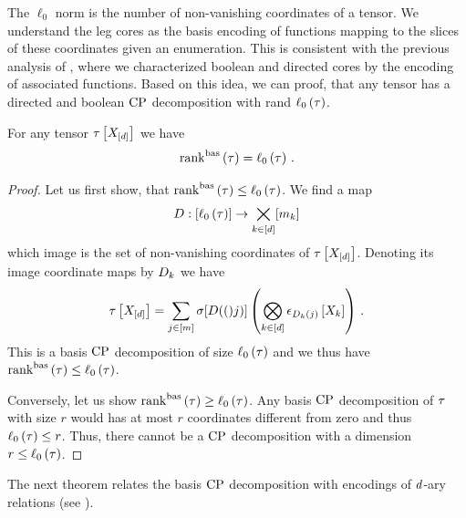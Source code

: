 
The $\ell_0$ norm is the number of non-vanishing coordinates of a tensor.
We understand the leg cores as the basis encoding of functions mapping to the slices of these coordinates given an enumeration.
This is consistent with the previous analysis of , where we characterized boolean and directed cores by the encoding of associated functions.
Based on this idea, we can proof, that any tensor has a directed and boolean $\mathrm{CP}$ decomposition with rand $\ell_0\left(\tau\right)$.


\begin{theorem}
    \label{the:sparseBasisCP}
    For any tensor $\tau\left[X_{[d]}\right]$ we have
    \begin{align*}
        \mathrm{rank}^{\mathrm{bas}}\left(\tau\right) = \ell_0\left(\tau\right) \, .
    \end{align*}
\end{theorem}
\begin{proof}
    Let us first show, that $\mathrm{rank}^{\mathrm{bas}}\left(\tau\right) \leq \ell_0\left(\tau\right)$.
    We find a map
    \begin{align*}
        D : [\ell_0\left(\tau\right)] \rightarrow  \bigtimes_{k\in[d]}[m_{k}]
    \end{align*}
    which image is the set of non-vanishing coordinates of $\tau\left[X_{[d]}\right]$.
    Denoting its image coordinate maps by $D_{k}$ we have
    \begin{align*}
        \tau\left[X_{[d]}\right]
        = \sum_{j\in[m]} \sigma[D(()j)] \left(\bigotimes_{k\in[d]} \epsilon_{D_{k}(j)}\left[X_{k}\right] \right) \, .
    \end{align*}
    This is a basis $\mathrm{CP}$ decomposition of size $\ell_0\left(\tau\right)$ and we thus have $\mathrm{rank}^{\mathrm{bas}}\left(\tau\right)\leq\ell_0\left(\tau\right)$.

    Conversely, let us show $\mathrm{rank}^{\mathrm{bas}}\left(\tau\right) \geq \ell_0\left(\tau\right)$.
    Any basis $\mathrm{CP}$ decomposition of $\tau$ with size $r$ would has at most $r$ coordinates different from zero and thus $\ell_0\left(\tau\right)\leq r$.
    Thus, there cannot be a $\mathrm{CP}$ decomposition with a dimension $r\leq\ell_0\left(\tau\right)$.
\end{proof}

%
The next theorem relates the basis $\mathrm{CP}$ decomposition with encodings of $d$-ary relations (see ).

